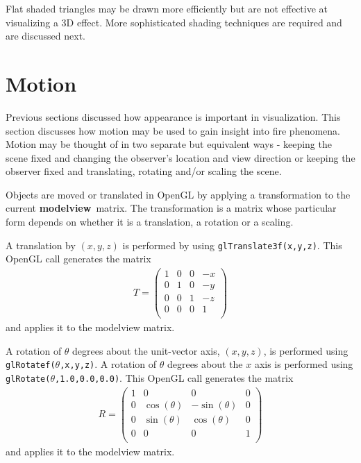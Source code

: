 \documentclass[11pt,twoside]{book}
\begin{document}
Flat shaded triangles may be drawn more efficiently but are not
effective at visualizing a 3D effect.  More sophisticated shading
techniques are required and are discussed next.



%
%

\section{Motion} Previous sections discussed how appearance is important
in visualization.  This section discusses how motion may be used to gain
insight into fire phenomena.  Motion may be thought of in two separate but
equivalent ways - keeping the scene fixed and changing the observer's location
and view direction or keeping the observer fixed and translating, rotating
and/or scaling the scene.

Objects are moved or translated in OpenGL by applying a transformation to
the current {\bf modelview}\ matrix.  The transformation is a matrix whose
particular form depends on whether it is a translation, a rotation or a scaling.

A translation by $(x,y,z)$ is performed by using {\tt glTranslate3f(x,y,z)}.
This OpenGL call generates the matrix
\begin{eqnarray*}
T=\left(%
\begin{array}{cccc}
  1 & 0 & 0 & -x \\
  0 & 1 & 0 & -y \\
  0 & 0 & 1 & -z \\
  0 & 0 & 0 & 1 \\
\end{array}%
\right)
\end{eqnarray*}
and applies it to the modelview matrix.

A rotation of $\theta$ degrees about the unit-vector axis, $(x,y,z)$,
is performed using {\tt glRotatef($\theta$,x,y,z)}.  A rotation of
$\theta$ degrees about the $x$ axis is performed using {\tt glRotate($\theta$,1.0,0.0,0.0)}.
This OpenGL call generates the matrix
\begin{eqnarray*}
R=\left(%
\begin{array}{cccc}
  1 & 0 & 0 & 0 \\
  0 & \cos(\theta) & -\sin(\theta) & 0 \\
  0 & \sin(\theta) & \cos(\theta) & 0 \\
  0 & 0 & 0 & 1 \\
\end{array}%
\right)
\end{eqnarray*}
and applies it to the modelview matrix.
\end{document}
